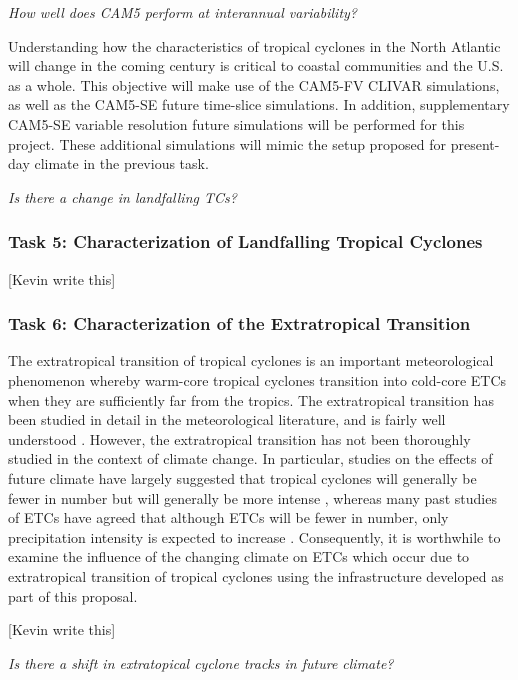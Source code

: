 \documentclass[11pt]{article}
\begin{document}
\emph{How well does CAM5 perform at interannual variability?}

Understanding how the characteristics of tropical cyclones in the North Atlantic will change in the coming century is critical to coastal communities and the U.S. as a whole. This objective will make use of the CAM5-FV CLIVAR simulations, as well as the CAM5-SE future time-slice simulations. In addition, supplementary CAM5-SE variable resolution future simulations will be performed for this project. These additional simulations will mimic the setup proposed for present-day climate in the previous task. 

\emph{Is there a change in landfalling TCs?}

\subsubsection{Task 5: Characterization of Landfalling Tropical Cyclones}

{\color{red}[Kevin write this]}

\subsubsection{Task 6: Characterization of the Extratropical Transition}

The extratropical transition of tropical cyclones is an important meteorological phenomenon whereby warm-core tropical cyclones transition into cold-core ETCs when they are sufficiently far from the tropics.  The extratropical transition has been studied in detail in the meteorological literature, and is fairly well understood \citep{hart2001climatology}.  However, the extratropical transition has not been thoroughly studied in the context of climate change.  In particular, studies on the effects of future climate have largely suggested that tropical cyclones will generally be fewer in number but will generally be more intense \citep{li2013hurricanes}, whereas many past studies of ETCs have agreed that although ETCs will be fewer in number, only precipitation intensity is expected to increase \citep{bengtsson2009will}.  Consequently, it is worthwhile to examine the influence of the changing climate on ETCs which occur due to extratropical transition of tropical cyclones using the infrastructure developed as part of this proposal.

{\color{red}[Kevin write this]}

\emph{Is there a shift in extratopical cyclone tracks in future climate?}
\end{document}
